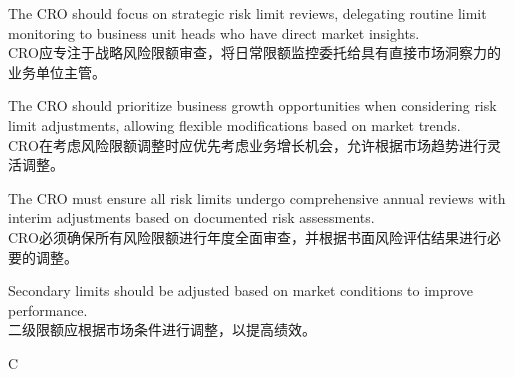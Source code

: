 \documentclass{article}
\begin{document}
        \begin{choices}
            \item The CRO should focus on strategic risk limit reviews, delegating routine limit monitoring to business unit heads who have direct market insights.\\
            CRO应专注于战略风险限额审查，将日常限额监控委托给具有直接市场洞察力的业务单位主管。
            \item The CRO should prioritize business growth opportunities when considering risk limit adjustments, allowing flexible modifications based on market trends.\\
            CRO在考虑风险限额调整时应优先考虑业务增长机会，允许根据市场趋势进行灵活调整。
            
            \item The CRO must ensure all risk limits undergo comprehensive annual reviews with interim adjustments based on documented risk assessments.\\
            CRO必须确保所有风险限额进行年度全面审查，并根据书面风险评估结果进行必要的调整。
            
            \item Secondary limits should be adjusted based on market conditions to improve performance.\\
            二级限额应根据市场条件进行调整，以提高绩效。
        \end{choices}
            
        \begin{correctanswer}
            C
        \end{correctanswer}
            
\end{document}
